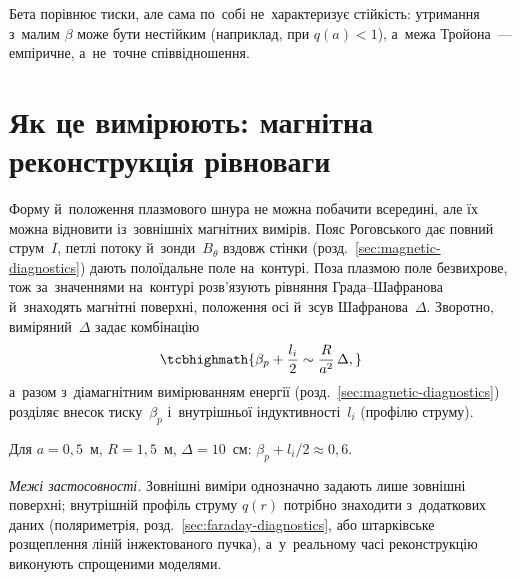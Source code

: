 \begin{Attention}
	Бета порівнює тиски, але сама по~собі не~характеризує стійкість: утримання з~малим $\beta$ може бути нестійким (наприклад, при $q(a)<1$), а~межа Тройона~--- емпіричне,
	а~не~точне співвідношення.
\end{Attention}

\section{Як це вимірюють: магнітна реконструкція рівноваги}\label{sec:equilibrium-diagnostics}

Форму й~положення плазмового шнура не можна побачити всередині, але їх можна відновити із~зовнішніх магнітних вимірів. Пояс Роговського дає повний струм~$I$,
петлі потоку й~зонди~$B_\theta$ вздовж стінки (розд.~\ref{sec:magnetic-diagnostics}) дають полоїдальне поле на~контурі. Поза плазмою поле безвихрове, тож за~значеннями на~контурі
розв'язують рівняння Града--Шафранова й~знаходять магнітні поверхні, положення осі й~зсув Шафранова~$\Delta$. Зворотно, виміряний~$\Delta$ задає комбінацію
\begin{equation}\label{eq:shafranov-diagnostic}
	\tcbhighmath{\beta_p+\frac{l_i}{2}\sim\frac{R}{a^2}\,\Delta,}
\end{equation}
а~разом з~діамагнітним вимірюванням енергії (розд.~\ref{sec:magnetic-diagnostics}) розділяє внесок тиску~$\beta_p$ і~внутрішньої індуктивності~$l_i$ (профілю струму).
\begin{Estimate}
Для $a=0{,}5$~м, $R=1{,}5$~м, $\Delta=10$~см: $\beta_p+l_i/2\approx0{,}6$.
\end{Estimate}

\emph{Межі застосовності.} Зовнішні виміри однозначно задають лише зовнішні поверхні; внутрішній профіль струму $q(r)$ потрібно знаходити з~додаткових даних
(поляриметрія, розд.~\ref{sec:faraday-diagnostics}, або штарківське розщеплення ліній інжектованого пучка), а~у~реальному часі реконструкцію виконують спрощеними моделями.

